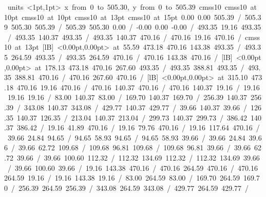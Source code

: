 \hbox{\beginpicture
\setcoordinatesystem units <1pt,1pt>
\setplotarea x from 0 to 505.30, y from 0 to 505.39
\setlinear
\font\picfont cmss10\picfont
\font\picfont cmss10 at 10pt\picfont
\font\picfont cmss10 at 10pt\picfont
\font\picfont cmss10 at 13pt\picfont
\font\picfont cmss10 at 15pt\picfont
\setsolid
{} 0.00 0.00 505.39 /
 505.39 505.30 505.39 /
 505.39 505.30 0.00 /
 -0.00 0.00 -0.00 /
\setsolid
{} 493.35 19.16 493.35 /
 493.35 140.37 493.35 /
 493.35 140.37 470.16 /
 470.16 19.16 470.16 /
\font\picfont cmss10 at 13pt\picfont
{}  [lB] <0.00pt,0.00pt> at 55.59 473.18
\setsolid
{} 470.16 143.38 493.35 /
 493.35 264.59 493.35 /
 493.35 264.59 470.16 /
 470.16 143.38 470.16 /
  [lB] <0.00pt,0.00pt> at 178.13 473.18
\setsolid
{} 470.16 267.60 493.35 /
 493.35 388.81 493.35 /
 493.35 388.81 470.16 /
 470.16 267.60 470.16 /
  [lB] <0.00pt,0.00pt> at 315.10 473.18
\setsolid
{} 470.16 19.16 470.16 /
 470.16 140.37 470.16 /
 470.16 140.37 19.16 /
 19.16 19.16 19.16 /
\setsolid
{} 83.00 140.37 83.00 /
\setsolid
{} 169.70 140.37 169.70 /
\setsolid
{} 256.39 140.37 256.39 /
\setsolid
{} 343.08 140.37 343.08 /
\setsolid
{} 429.77 140.37 429.77 /
\setsolid
{} 39.66 140.37 39.66 /
\setsolid
{} 126.35 140.37 126.35 /
\setsolid
{} 213.04 140.37 213.04 /
\setsolid
{} 299.73 140.37 299.73 /
\setsolid
{} 386.42 140.37 386.42 /
\setsolid
{} 19.16 41.89 470.16 /
\setsolid
{} 19.16 79.76 470.16 /
\setsolid
{} 19.16 117.64 470.16 /
\setsolid
{} 39.66 24.84 94.65 /
 94.65 58.93 94.65 /
 94.65 58.93 39.66 /
 39.66 24.84 39.66 /
\setsolid
{} 39.66 62.72 109.68 /
 109.68 96.81 109.68 /
 109.68 96.81 39.66 /
 39.66 62.72 39.66 /
\setsolid
{} 39.66 100.60 112.32 /
 112.32 134.69 112.32 /
 112.32 134.69 39.66 /
 39.66 100.60 39.66 /
\setsolid
{} 19.16 143.38 470.16 /
 470.16 264.59 470.16 /
 470.16 264.59 19.16 /
 19.16 143.38 19.16 /
\setsolid
{} 83.00 264.59 83.00 /
\setsolid
{} 169.70 264.59 169.70 /
\setsolid
{} 256.39 264.59 256.39 /
\setsolid
{} 343.08 264.59 343.08 /
\setsolid
{} 429.77 264.59 429.77 /
}
